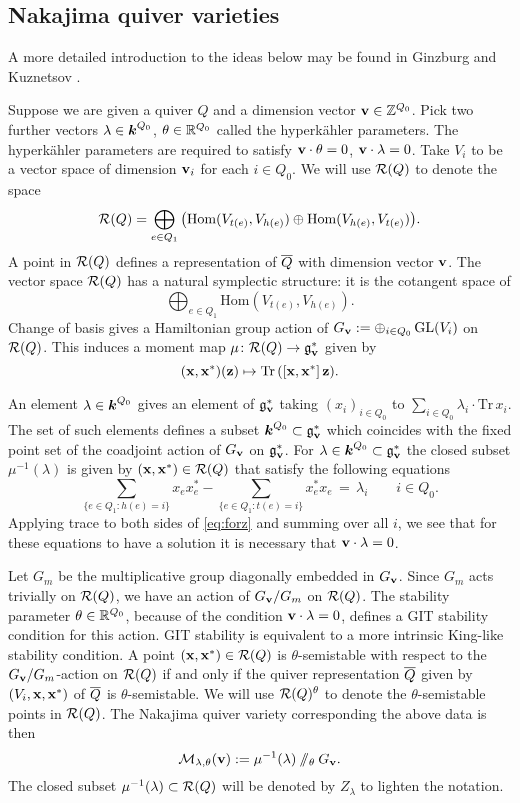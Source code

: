 \documentclass{amsart}
\theoremstyle{definition}
\renewcommand{\Tr}{\textup{Tr}\,}
\begin{document}
\subsection{Nakajima quiver varieties}\label{ssc:back}
A more detailed introduction to the ideas below may be found in Ginzburg \cite{Ginzburg} and Kuznetsov \cite{Kuznetsov}.

Suppose we are given a quiver $Q$ and a dimension vector $\mathbf{v}\in \mathbb{Z}^{Q_0}$. Pick two further vectors $\lambda\in{\boldsymbol{k}}^{Q_0}$, $\theta\in\mathbb{R}^{Q_0}$ called the hyperk\"ahler parameters. The hyperk\"ahler parameters are required to satisfy $\mathbf{v}\cdot \theta=0$, $\mathbf{v}\cdot \lambda=0$.
Take $V_i$ to be a vector space of dimension $\mathbf{v}_i$ for each $i\in Q_0$. We will use $\mathcal{R}(Q)$ to denote the space 
$$\mathcal{R}(Q)=\bigoplus_{e \in Q_1}\big(\text{Hom}(V_{t(e)}, V_{h(e)}) \oplus \text{Hom}(V_{h(e)}, V_{t(e)})\big).$$
A point in $\mathcal{R}(Q)$ defines a representation of ${\overline{Q}}$ with dimension vector $\mathbf{v}$.
The vector space $\mathcal{R}(Q)$ has a natural symplectic structure: it is the cotangent space of $$\bigoplus_{e \in Q_1}\text{Hom}(V_{t(e)}, V_{h(e)}).$$
Change of basis gives a Hamiltonian group action of $G_\mathbf{v}:= \oplus_{i \in Q_0} \operatorname{GL}(V_i)$ on $\mathcal{R}(Q)$. 
This induces a moment map $\mu \colon \mathcal{R}(Q) \rightarrow \mathfrak{g}_{\mathbf{v}}^*$ given by $$(\bfx,\bfx^*)(\bfz) \mapsto  \Tr([\bfx,\bfx^*]\,\bfz).$$

An element $\lambda \in {\boldsymbol{k}}^{Q_0}$ gives an element of $\mathfrak{g}_{\mathbf{v}}^*$ taking $(x_i)_{i\in Q_0}$ to $\sum_{i\in Q_0} \lambda_i \cdot \text{Tr}\, x_i$.
The set of such elements defines a subset ${\boldsymbol{k}}^{Q_0} \subset \mathfrak{g}_{\mathbf{v}}^*$ which coincides with the fixed point set of the coadjoint action of $G_{\mathbf{v}}$ on $\mathfrak{g}_{\mathbf{v}}^*$.
For $\lambda \in {\boldsymbol{k}}^{Q_0} \subset \mathfrak{g}_{\mathbf{v}}^*$ the closed subset $\mu^{-1}(\lambda)$ is given by $(\mathbf{x},\mathbf{x}^*) \in \mathcal{R}(Q)$ that satisfy the following equations 
\begin{equation}\label{eq:forz}
\sum_{\{e \in Q_1\colon h(e)=i\}} x_e x_e^* -  \sum_{\{e \in Q_1\colon t(e)=i\}} x_e^* x_e\,=\,\lambda_i \qquad i\in Q_0.
\end{equation}
Applying trace to both sides of \eqref{eq:forz} and summing over all $i$, we see that for these equations to have a solution it is necessary that $\mathbf{v}\cdot \lambda=0$.

Let $G_m$ be the multiplicative group diagonally embedded in $G_{\mathbf{v}}$. Since $G_m$ acts trivially on $\mathcal{R}(Q)$, we have an action of $G_{\mathbf{v}}/G_m$ on $\mathcal{R}(Q)$. The stability parameter $\theta \in \mathbb{R}^{Q_0}$, because of the condition $\mathbf{v}\cdot \lambda=0$, defines a GIT stability condition for this action. GIT stability is equivalent to a more intrinsic King-like stability condition. A point $(\mathbf{x},\mathbf{x}^*) \in \mathcal{R}(Q)$ is $\theta$-semistable with respect to the $G_{\mathbf{v}}/G_m$-action on $\mathcal{R}(Q)$ if and only if the quiver representation ${\overline{Q}}$ given by $(V_i, \mathbf{x},\mathbf{x}^*)$ of ${\overline{Q}}$ is $\theta$-semistable. We will use $\mathcal{R}(Q)^\theta$ to denote the $\theta$-semistable points in $\mathcal{R}(Q)$. The Nakajima quiver variety corresponding the above data is then $$\mathcal{M}_{\lambda, \theta}(\mathbf{v}) := \mu^{-1}(\lambda)\sslash_\theta G_{\mathbf{v}}.$$ The closed subset $\mu^{-1}(\lambda) \subset \mathcal{R}(Q)$ will be denoted by $Z_\lambda$ to lighten the notation. 
\end{document}
